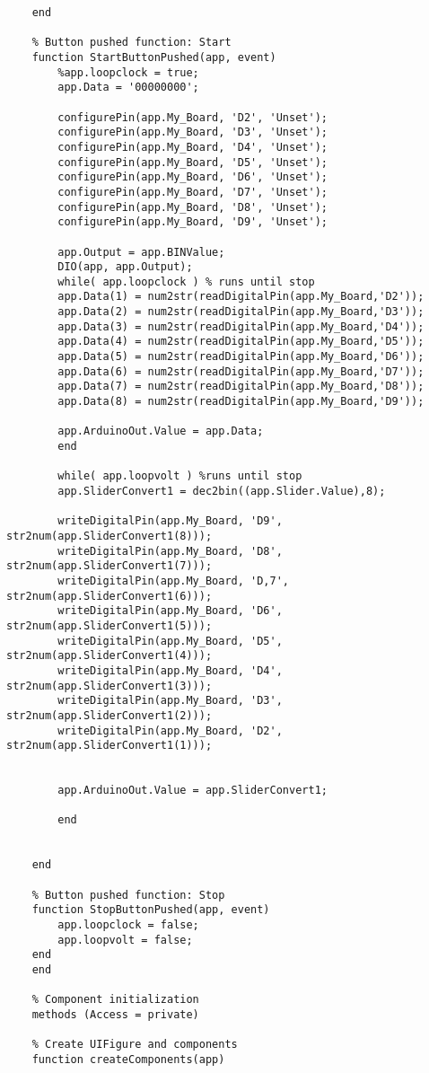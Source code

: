 \documentclass[11pt]{article}
\begin{document}
\begin{verbatim}
	end

	% Button pushed function: Start
	function StartButtonPushed(app, event)
	    %app.loopclock = true;
	    app.Data = '00000000';

	    configurePin(app.My_Board, 'D2', 'Unset');
	    configurePin(app.My_Board, 'D3', 'Unset');
	    configurePin(app.My_Board, 'D4', 'Unset');
	    configurePin(app.My_Board, 'D5', 'Unset');
	    configurePin(app.My_Board, 'D6', 'Unset');
	    configurePin(app.My_Board, 'D7', 'Unset');
	    configurePin(app.My_Board, 'D8', 'Unset');
	    configurePin(app.My_Board, 'D9', 'Unset');

	    app.Output = app.BINValue;
	    DIO(app, app.Output);
	    while( app.loopclock ) % runs until stop
		app.Data(1) = num2str(readDigitalPin(app.My_Board,'D2'));
		app.Data(2) = num2str(readDigitalPin(app.My_Board,'D3'));
		app.Data(3) = num2str(readDigitalPin(app.My_Board,'D4'));
		app.Data(4) = num2str(readDigitalPin(app.My_Board,'D5'));
		app.Data(5) = num2str(readDigitalPin(app.My_Board,'D6'));
		app.Data(6) = num2str(readDigitalPin(app.My_Board,'D7'));
		app.Data(7) = num2str(readDigitalPin(app.My_Board,'D8'));
		app.Data(8) = num2str(readDigitalPin(app.My_Board,'D9'));

		app.ArduinoOut.Value = app.Data;
	    end

	    while( app.loopvolt ) %runs until stop
		app.SliderConvert1 = dec2bin((app.Slider.Value),8);

		writeDigitalPin(app.My_Board, 'D9', str2num(app.SliderConvert1(8)));
		writeDigitalPin(app.My_Board, 'D8', str2num(app.SliderConvert1(7)));
		writeDigitalPin(app.My_Board, 'D,7', str2num(app.SliderConvert1(6)));
		writeDigitalPin(app.My_Board, 'D6', str2num(app.SliderConvert1(5)));
		writeDigitalPin(app.My_Board, 'D5', str2num(app.SliderConvert1(4)));
		writeDigitalPin(app.My_Board, 'D4', str2num(app.SliderConvert1(3)));
		writeDigitalPin(app.My_Board, 'D3', str2num(app.SliderConvert1(2)));
		writeDigitalPin(app.My_Board, 'D2', str2num(app.SliderConvert1(1)));


		app.ArduinoOut.Value = app.SliderConvert1;

	    end


	end

	% Button pushed function: Stop
	function StopButtonPushed(app, event)
	    app.loopclock = false;
	    app.loopvolt = false;
	end
    end

    % Component initialization
    methods (Access = private)

	% Create UIFigure and components
	function createComponents(app)


\end{verbatim}
\end{document}
